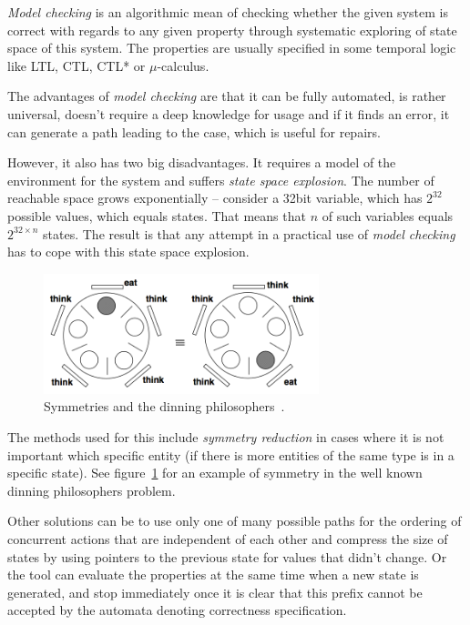 {\em Model checking} is an algorithmic mean of checking whether the given system is correct with regards to any given property through systematic exploring of state space of this system. The properties are usually specified in some temporal logic like LTL, CTL, CTL* or $\mu$-calculus.

The advantages of {\em model checking} are that it can be fully automated, is rather universal, doesn't require a deep knowledge for usage and if it finds an error, it can generate a path leading to the case, which is useful for repairs.

However, it also has two big disadvantages. It requires a model of the environment for the system and suffers {\em state space explosion}. The number of reachable space grows exponentially -- consider a 32bit variable, which has $2^{32}$ possible values, which equals states. That means that $n$ of such variables equals $2^{32\times n}$ states. The result is that any attempt in a practical use of {\em model checking} has to cope with this state space explosion.

\begin{figure}
  \centering
 \includegraphics[width=8cm,keepaspectratio]{fig/dinning-symmetry} %
\caption{Symmetries and the dinning philosophers~\cite{KrenaVojnarOverview}.}
\label{fig:fav:dinning}
\end{figure}

The methods used for this include {\em symmetry reduction} in cases where it is not important which specific entity (if there is more entities of the same type is in a specific state). See figure~\ref{fig:fav:dinning} for an example of symmetry in the well known dinning philosophers problem.

Other solutions can be to use only one of many possible paths for the ordering of concurrent actions that are independent of each other and compress the size of states by using pointers to the previous state for values that didn't change. Or the tool can evaluate the properties at the same time when a new state is generated, and stop immediately once it is clear that this prefix cannot be accepted by the automata denoting correctness specification.


